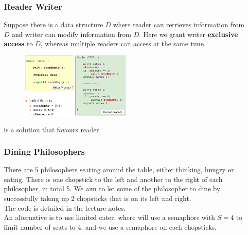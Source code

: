 \documentclass[11pt]{article}
\theoremstyle{definition}
\begin{document}
\subsubsection{Reader Writer}
Suppose there is a data structure $D$ where reader can retrieves information from $D$ and writer can modify information from $D$. Here we grant writer \textbf{exclusive access} to $D$, whereas multiple readers can access at the same time.
\begin{figure}[h]
\centering
\includegraphics[width=0.5\textwidth]{5_2.png}
\end{figure}
is a solution that favours reader.
\subsubsection{Dining Philosophers}
There are 5 philosophers seating around the table, either thinking, hungry or eating. There is one chopstick to the left and another to the right of each philosopher, in total 5. We aim to let some of the philosopher to dine by successfully taking up 2 chopsticks that is on its left and right.\\
The code is detailed in the lecture notes.\\
An alternative is to use limited eater, where will use a semaphore with $S=4$ to limit number of seats to 4. and we use a semaphore on each chopsticks.
\end{document}
